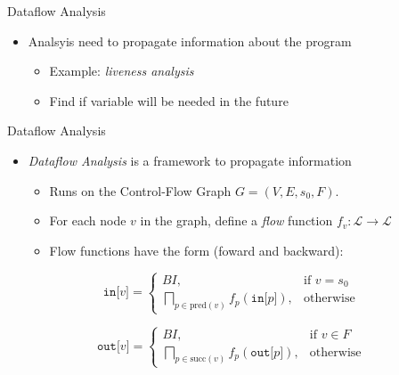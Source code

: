 
\begin{frame}{Dataflow Analysis}
\begin{itemize}
    \item Analsyis need to propagate information about the program
    \begin{itemize}
        \item Example: \textit{liveness analysis}
        \item Find if variable will be needed in the future
    \end{itemize}
\end{itemize}
\end{frame}


\begin{frame}{Dataflow Analysis}
\begin{itemize}
    \item \textit{Dataflow Analysis} is a framework to propagate information
    \begin{itemize}
        \item Runs on the Control-Flow Graph $G = (V, E, s_0, F)$.
        \item For each node $v$ in the graph, define a \textit{flow} function
              $f_v : \mathcal{L} \longrightarrow \mathcal{L}$
        \item Flow functions have the form (foward and backward):
    \end{itemize}
\end{itemize}

\begin{equation}\label{eq:forward}
	\texttt{in[} v \texttt{]} = \begin{cases}
	  BI,& \text{if } v = s_0 \\
	  \bigsqcap_{p \in \text{pred}(v)}f_p(\texttt{in[}p\texttt{]}) ,& \text{otherwise}
	\end{cases}
\end{equation}

\begin{equation}\label{eq:backward}
	\texttt{out[} v \texttt{]} = \begin{cases}
	  BI,& \text{if } v \in F \\
	  \bigsqcap_{p \in \text{succ}(v)}f_p(\texttt{out[}p\texttt{]}) ,& \text{otherwise}
	\end{cases}
\end{equation}

\end{frame}

